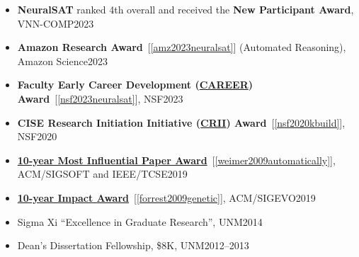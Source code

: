 \documentclass[11pt]{article}
\begin{document}
    \begin{itemize}
        \item \textbf{NeuralSAT} ranked 4th overall and received the \textbf{New Participant Award}, VNN-COMP\hfill 2023
      \item \textbf{Amazon Research Award}~[\ref{amz2023neuralsat}] (Automated Reasoning), Amazon Science\hfill 2023
      \item \textbf{Faculty Early Career Development (\href{https://www.nsf.gov/awardsearch/showAward?AWD_ID=2238133}{CAREER}) Award}~[\ref{nsf2023neuralsat}], NSF\hfill 2023

      \item \textbf{CISE Research Initiation Initiative (\href{https://www.nsf.gov/awardsearch/showAward?AWD_ID=1948536}{CRII}) Award}~[\ref{nsf2020kbuild}], NSF\hfill 2020

      \item \href{https://www.sigsoft.org/awards/icseMIPAward.html}{\textbf{10-year Most Influential Paper Award}}~[\ref{weimer2009automatically}], ACM/SIGSOFT and IEEE/TCSE\hfill 2019


      \item \href{https://sig.sigevo.org/index.html/tiki-index.php?page=SIGEVO+Impact+Award}{\textbf{10-year Impact Award}}~[\ref{forrest2009genetic}], ACM/SIGEVO\hfill 2019

      \item  Sigma Xi ``Excellence in Graduate Research'', UNM\hfill 2014
      \item Dean's Dissertation Fellowship, \$8K, UNM\hfill 2012--2013


\end{itemize}
\end{document}
